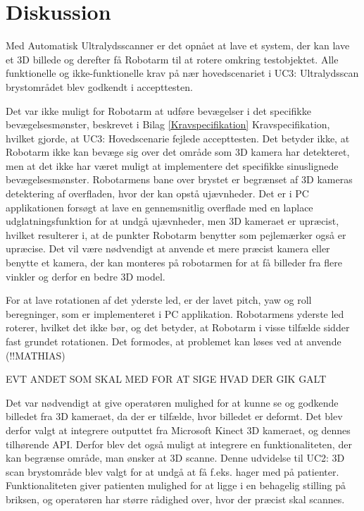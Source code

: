 \chapter{Diskussion}\label{kapitel_Diskussion}
Med Automatisk Ultralydsscanner er det opnået at lave et system, der kan lave et 3D billede og derefter få Robotarm til at rotere omkring testobjektet. Alle funktionelle og ikke-funktionelle krav på nær hovedscenariet i UC3: Ultralydsscan brystområdet blev godkendt i accepttesten. 

Det var ikke muligt for Robotarm at udføre bevægelser i det specifikke bevægelsesmønster, beskrevet i Bilag \ref{Kravspecifikation} Kravspecifikation, hvilket gjorde, at UC3: Hovedscenarie fejlede accepttesten. Det betyder ikke, at Robotarm ikke kan bevæge sig over det område som 3D kamera har detekteret, men at det ikke har været muligt at implementere det specifikke sinuslignede bevægelsesmønster. Robotarmens bane over brystet er begrænset af 3D kameras detektering af overfladen, hvor der kan opstå ujævnheder. Det er i PC applikationen forsøgt at lave en gennemsnitlig overflade med en laplace udglatningsfunktion for at undgå ujævnheder, men 3D kameraet er upræcist, hvilket resulterer i, at de punkter Robotarm benytter som pejlemærker også er upræcise. Det vil være nødvendigt at anvende et mere præcist kamera eller benytte et kamera, der kan monteres på robotarmen for at få billeder fra flere vinkler og derfor en bedre 3D model. 

For at lave rotationen af det yderste led, er der lavet pitch, yaw og roll beregninger, som er implementeret i PC applikation. Robotarmens yderste led roterer, hvilket det ikke bør, og det betyder, at Robotarm i visse tilfælde sidder fast grundet rotationen. Det formodes, at problemet kan løses ved at anvende (!!MATHIAS) 

EVT ANDET SOM SKAL MED FOR AT SIGE HVAD DER GIK GALT 


Det var nødvendigt at give operatøren mulighed for at kunne se og godkende billedet fra 3D kameraet, da der er tilfælde, hvor billedet er deformt. Det blev derfor valgt at integrere outputtet fra Microsoft Kinect 3D kameraet, og dennes tilhørende API. Derfor blev det også muligt at integrere en funktionaliteten, der kan begrænse område, man ønsker at 3D scanne. Denne udvidelse til UC2: 3D scan brystområde blev valgt for at undgå at få f.eks. hager med på patienter. Funktionaliteten giver patienten mulighed for at ligge i en behagelig stilling på briksen, og operatøren har større rådighed over, hvor der præcist skal scannes. 

